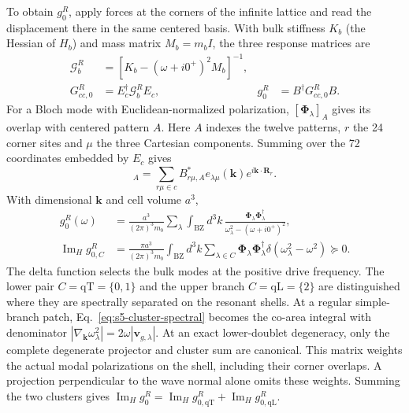 \documentclass[10pt,aps,onecolumn,floatfix,notitlepage,nofootinbib,showkeys]{revtex4-2}
\newcommand{\vk}{\bm{k}}
\newcommand{\vR}{\bm{R}}
\newcommand{\BZ}{\mathrm{BZ}}
\newcommand{\qT}{\mathrm{qT}}
\newcommand{\qL}{\mathrm{qL}}
\newcommand{\ImH}{\operatorname{Im}_{\!H}}
\begin{document}
To obtain $g_0^R$, apply forces at the corners of the infinite lattice and read the displacement there in the same centered basis. With bulk stiffness $K_b$ (the Hessian of $H_b$) and mass matrix $M_b=m_bI$, the three response matrices are
\begin{align}
 \mathcal G_b^R&=[K_b-(\omega+i0^+)^2M_b]^{-1},\\
 G_{cc,0}^R&=E_c^\dagger\mathcal G_b^RE_c,
 &g_0^R&=B^\dagger G_{cc,0}^RB.
 \label{eq:s5-green-levels}
\end{align}
For a Bloch mode with Euclidean-normalized polarization, $[\bm\Phi_\lambda]_A$ gives its overlap with centered pattern $A$. Here $A$ indexes the twelve patterns, $r$ the 24 corner sites and $\mu$ the three Cartesian components. Summing over the 72 coordinates embedded by $E_c$ gives
\begin{equation}
 [\bm\Phi_\lambda(\vk)]_A
 =\sum_{r\mu\in c}B_{r\mu,A}^*
 e_{\lambda\mu}(\vk)e^{i\vk\cdot\vR_r}.
 \label{eq:s5-form-factor}
\end{equation}
With dimensional $\vk$ and cell volume $a^3$,
\begin{align}
 g_0^R(\omega)
 &=\frac{a^3}{(2\pi)^3m_b}
 \sum_\lambda\int_{\BZ}d^3k\,
 \frac{\bm\Phi_\lambda\bm\Phi_\lambda^\dagger}
 {\omega_\lambda^2-(\omega+i0^+)^2},
 \label{eq:s5-bloch-resolvent}\\
 \ImH g_{0,C}^R
 &=\frac{\pi a^3}{(2\pi)^3m_b}
 \int_{\BZ}d^3k\sum_{\lambda\in C}
 \bm\Phi_\lambda\bm\Phi_\lambda^\dagger
 \delta(\omega_\lambda^2-\omega^2)\succeq0.
 \label{eq:s5-cluster-spectral}
\end{align}
The delta function selects the bulk modes at the positive drive frequency. The lower pair $C=\qT=\{0,1\}$ and the upper branch $C=\qL=\{2\}$ are distinguished where they are spectrally separated on the resonant shells.  At a regular simple-branch patch, Eq.~\eqref{eq:s5-cluster-spectral} becomes the co-area integral with denominator $|\nabla_{\vk}\omega_\lambda^2|=2\omega|\bm v_{g,\lambda}|$.  At an exact lower-doublet degeneracy, only the complete degenerate projector and cluster sum are canonical.  This matrix weights the actual modal polarizations on the shell, including their corner overlaps. A projection perpendicular to the wave normal alone omits these weights. Summing the two clusters gives $\ImH g_0^R=\ImH g_{0,\qT}^R+\ImH g_{0,\qL}^R$.
\end{document}
